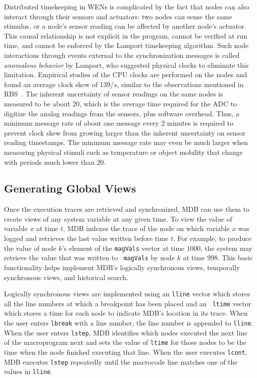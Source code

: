 Distributed timekeeping in WENs is complicated by the fact that nodes can also
interact through their sensors and actuators: two nodes can sense the same
stimulus, or a node's sensor reading can be affected by another node's actuator.
This causal relationship is not explicit in the program, cannot be verified at
run time, and cannot be enforced by the Lamport timekeeping algorithm. Such node
interactions through events external to the synchronization messages is called
\emph{anomalous behavior} by Lamport, who suggested physical clocks to eliminate
this limitation.  Empirical studies of the CPU clocks are performed on the
\tmotesky nodes and found an average clock skew of 139\us/$s$, similar to the
observations mentioned in RBS~\cite{Elson2002}. The inherent uncertainty of
sensor readings on the same nodes is measured to be about 20\ms, which is the
average time required for the ADC to digitize the analog readings from the
sensors, plus software overhead.  Thus, a minimum message rate of about one
message every 2 minutes is required to prevent clock skew from growing larger
than the inherent uncertainty on sensor reading timestamps.  The minimum message
rate may even be much larger when measuring physical stimuli such as temperature
or object mobility that change with periods much lower than 20\ms.

\subsection{Generating Global Views} \label{genViews}

Once the execution traces are retrieved and synchronized, MDB can use them to
create views of any system variable at any given time.  To view the value of
variable $x$ at time $t$, MDB indexes the trace of the node on which variable
$x$ was logged and retrieves the last value written before time $t$.  For
example, to produce the value of node $k$'s element of the {\tt magVals} vector
at time $1000$, the system may retrieve the value that was written to {\tt
magVals} by node $k$ at time $998$.  This basic functionality helps implement
MDB's logically synchronous views, temporally synchronous views, and historical
search.

Logically synchronous views are implemented using an {\tt lline} vector which
stores all the line numbers at which a breakpoint has been placed and an {\tt
ltime} vector which stores a time for each node to indicate MDB's location in
its trace. When the user enters {\tt lbreak} with a line number, the line number
is appended to {\tt lline}. When the user enters {\tt lstep}, MDB identifies
which nodes executed the next line of the macroprogram next and sets the value
of {\tt ltime} for those nodes to be the time when the node finished executing
that line. When the user executes {\tt lcont}, MDB executes {\tt lstep}
repeatedly until the macrocode line matches one of the values in {\tt lline}.

